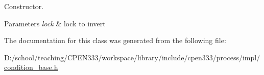 Constructor. 


\begin{DoxyParams}{Parameters}
{\em lock} & lock to invert \\
\hline
\end{DoxyParams}


The documentation for this class was generated from the following file\+:\begin{DoxyCompactItemize}
\item 
D\+:/school/teaching/\+C\+P\+E\+N333/workspace/library/include/cpen333/process/impl/\hyperlink{condition__base_8h}{condition\+\_\+base.\+h}\end{DoxyCompactItemize}

